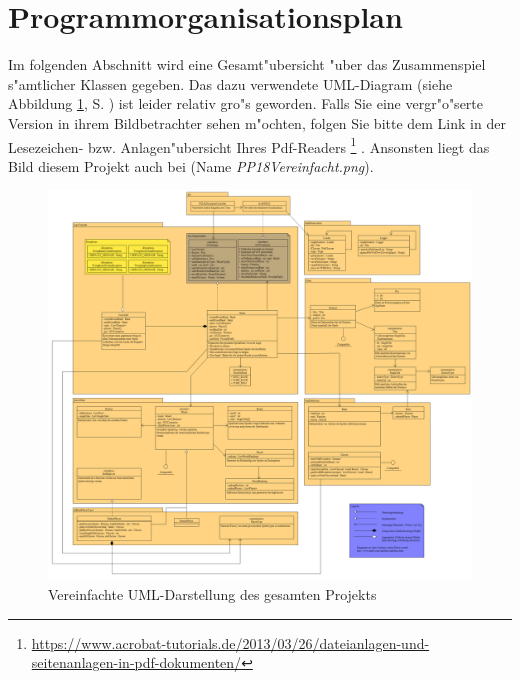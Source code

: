 \section{Programmorganisationsplan}
\label{sec:programmorganisationsplan}
Im folgenden Abschnitt wird eine Gesamt"ubersicht "uber das Zusammenspiel s"amtlicher Klassen gegeben. Das dazu verwendete UML-Diagram (siehe Abbildung \ref{fig:umlGesamtVereinfacht}, S. \pageref{fig:umlGesamtVereinfacht}) ist leider relativ gro"s geworden. Falls Sie eine vergr"o"serte Version in ihrem Bildbetrachter sehen m"ochten, folgen Sie bitte dem Link in der Lesezeichen- bzw. Anlagen"ubersicht Ihres Pdf-Readers
\footnote{\url{https://www.acrobat-tutorials.de/2013/03/26/dateianlagen-und-seitenanlagen-in-pdf-dokumenten/}}
. Ansonsten liegt das Bild diesem Projekt auch bei (Name \emph{PP18Vereinfacht.png}). 


\begin{figure}
	\centering
	\includegraphics[width=\linewidth]{pics/PP18Vereinfacht}
	\caption{Vereinfachte UML-Darstellung des gesamten Projekts}
	\label{fig:umlGesamtVereinfacht}
\end{figure}

